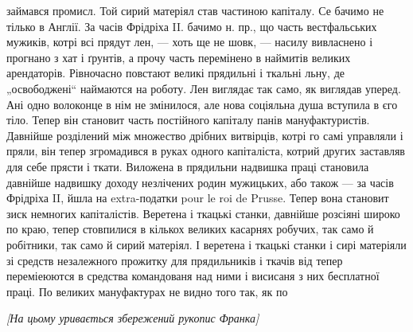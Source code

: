 займався промисл. Той сирий матеріял став частиною 
капіталу. Се бачимо не тілько в Англії. За часів
Фрідріха II. бачимо н. пр., що часть вестфальських мужиків,
котрі всі прядут лен, — хоть ще не шовк, — насилу
вивласнено і прогнано з хат і ґрунтів, а прочу часть перемінено
в наймитів великих арендаторів. Рівночасно повстают
великі прядильні і ткальні льну, де „освободжені“ наймаются
на роботу. Лен виглядає так само, як виглядав уперед.
Ані одно волоконце в нім не змінилося, але нова соціяльна
душа вступила в єго тіло. Тепер він становит часть постійного
капіталу панів мануфактуристів. Давнійше розділений
між множество дрібних витвірців, котрі го самі управляли
і пряли, він тепер згромадився в руках одного капіталіста,
котрий других заставляв для себе прясти і ткати. Виложена
в прядильни надвишка праці становила давнійше надвишку
доходу незлічених родин мужицьких, або також — за часів
Фрідріха II, йшла на extra-податки pour le roi de Prusse.
Тепер вона становит зиск немногих капіталістів. Веретена
і ткацькі станки, давнійше розсіяні широко по краю, тепер
стовпилися в кількох великих касарнях робучих, так само
й робітники, так само й сирий матеріял. І веретена і ткацькі
станки і сирі матеріяли зі средств незалежного прожитку
для прядильників і ткачів від тепер переміеюются в средства
командованя над ними і висисаня з них бесплатної
праці. По великих мануфактурах не видно того так, як по
\linebreak[4]
\makebox[\linewidth]{\dotfill}
\makebox[\linewidth]{\dotfill}

\begin{center}
\emph{[На цьому уривається збережений рукопис Франка]}
\end{center}
